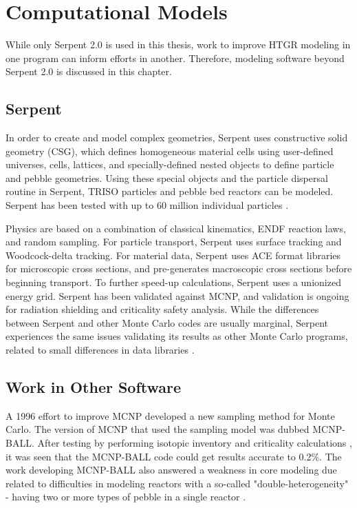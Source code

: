 
\section{Computational Models}

While only Serpent 2.0 \cite{leppanenjaakko_serpent_2015} is used in this thesis, work to improve HTGR modeling in one program can inform efforts in another.  Therefore, modeling software beyond Serpent 2.0 is discussed in this chapter.

\subsection{Serpent}

In order to create and model complex geometries, Serpent uses constructive solid geometry (CSG), which defines homogeneous material cells using user-defined universes, cells, lattices, and specially-defined nested objects to define particle and pebble geometries.  Using these special objects and the particle dispersal routine in Serpent, TRISO particles and pebble bed reactors can be modeled.  Serpent has been tested with up to 60 million individual particles \cite{noauthor_serpent_nodate}.

Physics are based on a combination of classical kinematics, ENDF reaction laws, and random sampling.  For particle transport, Serpent uses surface tracking and Woodcock-delta tracking.  For material data, Serpent uses ACE format libraries for microscopic cross sections, and pre-generates macroscopic cross sections before beginning transport.  To further speed-up calculations, Serpent uses a unionized energy grid.  Serpent has been validated against MCNP, and validation is ongoing for radiation shielding and criticality safety analysis.  While the differences between Serpent and other Monte Carlo codes are usually marginal, Serpent experiences the same issues validating its results as other Monte Carlo programs, related to small differences in data libraries \cite{noauthor_serpent_nodate}.

\subsection{Work in Other Software}

A 1996 effort to improve MCNP developed a new sampling method for Monte Carlo.  The version of MCNP that used the sampling model was dubbed MCNP-BALL.  After testing by performing isotopic inventory and criticality calculations , it was seen that the MCNP-BALL code could get results accurate to 0.2\%.  The work developing MCNP-BALL also answered a weakness in core modeling due related to difficulties in modeling reactors with a so-called "double-heterogeneity" - having two or more types of pebble in a single reactor \cite{murata_new_1997}.

